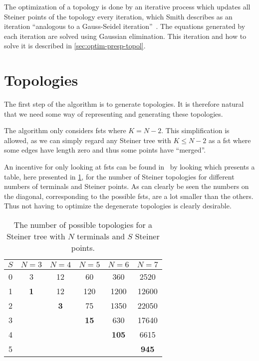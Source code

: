 The optimization of a topology is done by an iterative process which updates all
Steiner points of the topology every iteration, which Smith describes as an
iteration ``analogous to a Gauss-Seidel iteration''~\cite[p.~145]{Smith1992}.
The equations generated by each iteration are solved using Gaussian
elimination.  This iteration and how to solve it is described in
\cref{sec:optim-presp-topol}.

\section{Topologies}
\label{sec:topologies}

The first step of the algorithm is to generate topologies.  It is therefore
natural that we need some way of representing and generating these topologies.

The algorithm only considers \glspl{fst} where $K = N - 2$.  This simplification
is allowed, as we can simply regard any Steiner tree with $K \le N - 2$ as a
\gls{fst} where some edges have length zero and thus some points have
``merged''.

An incentive for only looking at \glspl{fst} can be found in~\cite{Gilbert1968}
by looking which presents a table, here presented in
\cref{tab:number-of-topologies}, for the number of Steiner topologies for
different numbers of terminals and Steiner points.  As can clearly be seen the
numbers on the diagonal, corresponding to the possible \glspl{fst}, are a lot
smaller than the others.  Thus not having to optimize the degenerate topologies
is clearly desirable.

\begin{table}[htbp]
  \centering
  \begin{tabular}{cccccc}
    \toprule
    $S$ & $N = 3$    & $N = 4$    & $N = 5$     & $N = 6$      & $N = 7$      \\
    \midrule
    0   & 3          & 12         & 60          & 360          & 2520         \\
    1   & \textbf{1} & 12         & 120         & 1200         & 12600        \\
    2   &            & \textbf{3} & 75          & 1350         & 22050        \\
    3   &            &            & \textbf{15} & 630          & 17640        \\
    4   &            &            &             & \textbf{105} & 6615         \\
    5   &            &            &             &              & \textbf{945} \\
    \bottomrule
  \end{tabular}
  \caption{The number of possible topologies for a Steiner tree with $N$
    terminals and $S$ Steiner points.\label{tab:number-of-topologies}}
\end{table}

